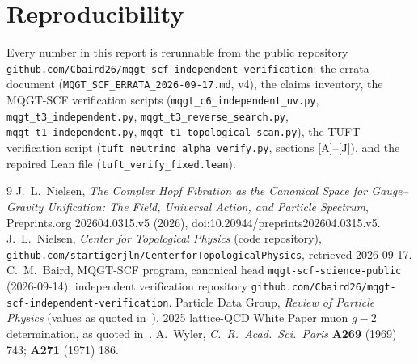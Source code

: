 \documentclass[11pt,letterpaper]{article}
\begin{document}
\section{Reproducibility}

Every number in this report is rerunnable from the public repository
\texttt{github.com/Cbaird26/mqgt-scf-independent-verification}: the errata
document (\texttt{MQGT\_SCF\_ERRATA\_2026-09-17.md}, v4), the claims
inventory, the MQGT-SCF verification scripts
(\texttt{mqgt\_c6\_independent\_uv.py}, \texttt{mqgt\_t3\_independent.py},
\texttt{mqgt\_t3\_reverse\_search.py}, \texttt{mqgt\_t1\_independent.py},
\texttt{mqgt\_t1\_topological\_scan.py}), the TUFT verification script
(\texttt{tuft\_neutrino\_alpha\_verify.py}, sections [A]--[J]), and the
repaired Lean file (\texttt{tuft\_verify\_fixed.lean}).

\begin{thebibliography}{9}
 J.~L.~Nielsen, \textit{The Complex Hopf Fibration as
the Canonical Space for Gauge--Gravity Unification: The Field, Universal
Action, and Particle Spectrum}, Preprints.org 202604.0315.v5 (2026),
doi:10.20944/preprints202604.0315.v5.
 J.~L.~Nielsen, \textit{Center for Topological Physics}
(code repository), \texttt{github.com/startigerjln/CenterforTopologicalPhysics},
retrieved 2026-09-17.
 C.~M.~Baird, MQGT-SCF program, canonical head
\texttt{mqgt-scf-science-public} (2026-09-14); independent verification
repository \texttt{github.com/Cbaird26/mqgt-scf-independent-verification}.
 Particle Data Group, \textit{Review of Particle Physics}
(values as quoted in~\cite{nielsen2026}).
 2025 lattice-QCD White Paper muon $g-2$ determination, as
quoted in~\cite{nielsen2026}.
 A.~Wyler, \textit{C.~R.~Acad.\ Sci.\ Paris} \textbf{A269}
(1969) 743; \textbf{A271} (1971) 186.
\end{thebibliography}
\end{document}
